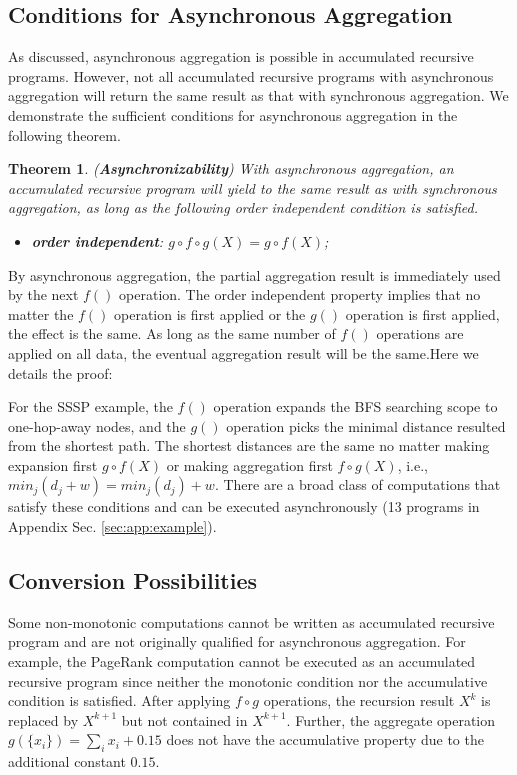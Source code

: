 \documentclass{vldb}
\newtheorem{theorem}{Theorem}
\begin{document}
\subsection{Conditions for Asynchronous Aggregation}
\label{sec:async:condition}

As discussed, asynchronous aggregation is possible in accumulated recursive programs. However, not all accumulated recursive programs with asynchronous aggregation will return the same result as that with synchronous aggregation. We demonstrate the sufficient conditions for asynchronous aggregation in the following theorem.

\begin{theorem}
	\label{th:async}
	(\textbf{Asynchronizability}) With asynchronous aggregation, an accumulated recursive program will yield to the same result as with synchronous aggregation, as long as the following order independent condition is satisfied.
	\begin{itemize}
		\item \textbf{order independent}: $g\circ f\circ g(X)=g\circ f(X)$;
	\end{itemize}
\end{theorem}

By asynchronous aggregation, the partial aggregation result is immediately used by the next $f()$ operation. The order independent property implies that no matter the $f()$ operation is first applied or the $g()$ operation is first applied, the effect is the same. As long as the same number of $f()$ operations are applied on all data, the eventual aggregation result will be the same.Here we details the proof:




For the SSSP example, the $f()$ operation expands the BFS searching scope to one-hop-away nodes, and the $g()$ operation picks the minimal distance resulted from the shortest path. The shortest distances are the same no matter making expansion first $g\circ f(X)$ or making aggregation first $f\circ g(X)$, i.e., $min_j(d_j+w)=min_j(d_j)+w$. There are a broad class of computations that satisfy these conditions and can be executed asynchronously (13 programs in Appendix Sec. \ref{sec:app:example}).


\subsection{Conversion Possibilities}
\label{sec:async:convert}

Some non-monotonic computations cannot be written as accumulated recursive program and are not originally qualified for asynchronous aggregation. For example, the PageRank computation cannot be executed as an accumulated recursive program since neither the monotonic condition nor the accumulative condition is satisfied. After applying $f\circ g$ operations, the recursion result $X^{k}$ is replaced by $X^{k+1}$ but not contained in $X^{k+1}$. Further, the aggregate operation $g(\{x_i\})=\sum_i{x_i}+0.15$ does not have the accumulative property due to the additional constant $0.15$.
\end{document}
